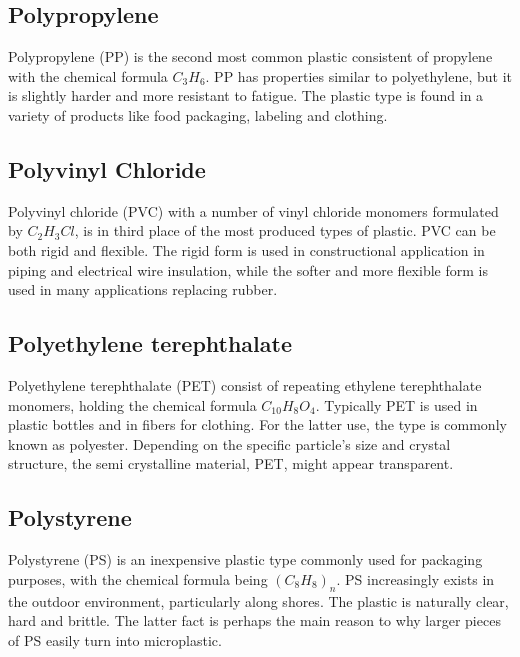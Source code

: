 \subsection{Polypropylene}
Polypropylene (PP) is the second most common plastic consistent of propylene with the chemical formula $C_3H_6$. PP has properties similar to polyethylene, but it is slightly harder and more resistant to fatigue. The plastic type is found in a variety of products like food packaging, labeling and clothing. 

\subsection{Polyvinyl Chloride}
Polyvinyl chloride (PVC) with a number of vinyl chloride monomers formulated by $C_2H_3Cl$, is in third place of the most produced types of plastic. PVC can be both rigid and flexible. The rigid form is used in constructional application in piping and electrical wire insulation, while the softer and more flexible form is used in many applications replacing rubber. 

\subsection{Polyethylene terephthalate}
Polyethylene terephthalate (PET) consist of repeating ethylene terephthalate monomers, holding the chemical formula $C_{10}H_8O_4$. Typically PET is used in plastic bottles and in fibers for clothing. For the latter use, the type is commonly known as polyester. Depending on the specific particle's size and crystal structure, the semi crystalline material, PET, might appear transparent. 

\subsection{Polystyrene}
Polystyrene (PS) is an inexpensive plastic type commonly used for packaging purposes, with the chemical formula being $(C_8H_8)_n$. PS increasingly exists in the outdoor environment, particularly along shores. The plastic is naturally clear, hard and brittle. The latter fact is perhaps the main reason to why larger pieces of PS easily turn into microplastic. 

\vspace{1.3cm}
